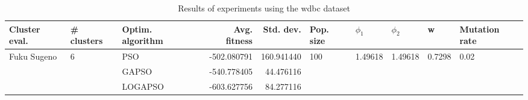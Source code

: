 \begin{table}
\centering
\caption{Results of experiments using the wdbc dataset}
\begin{tabular}{lllrrlllll}
\toprule
               Cluster eval. &        \# clusters & Optim. algorithm &  Avg. fitness &  Std. dev. &            Pop. size &               $\phi_{1}$ &               $\phi_{2}$ &                       w &         Mutation rate \\
\midrule
\multirow{3}{*}{Fuku Sugeno} & \multirow{3}{*}{6} &              PSO &   -502.080791 & 160.941440 & \multirow{3}{*}{100} & \multirow{3}{*}{1.49618} & \multirow{3}{*}{1.49618} & \multirow{3}{*}{0.7298} & \multirow{3}{*}{0.02} \\
                             &                    &            GAPSO &   -540.778405 &  44.476116 &                      &                          &                          &                         &                       \\
                             &                    &          LOGAPSO &   -603.627756 &  84.277116 &                      &                          &                          &                         &                       \\
\bottomrule
\end{tabular}
\end{table}
